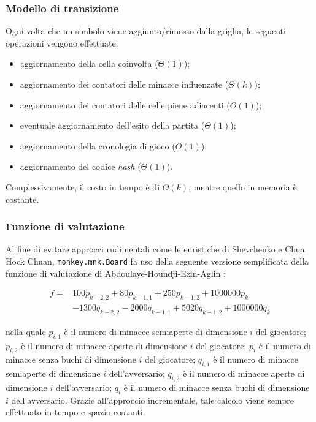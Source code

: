 \documentclass{article}
\begin{document}
\subsubsection{Modello di transizione}

Ogni volta che un simbolo viene aggiunto/rimosso dalla griglia, le seguenti
operazioni vengono effettuate:
\begin{itemize}
  \item aggiornamento della cella coinvolta ($\varTheta(1)$);
  \item aggiornamento dei contatori delle minacce influenzate ($\varTheta(k)$);
  \item aggiornamento dei contatori delle celle piene adiacenti
    ($\varTheta(1)$);
  \item eventuale aggiornamento dell'esito della partita ($\varTheta(1)$);
  \item aggiornamento della cronologia di gioco ($\varTheta(1)$);
  \item aggiornamento del codice \emph{hash} ($\varTheta(1)$).
\end{itemize}

Complessivamente, il costo in tempo è di $\varTheta(k)$, mentre quello in
memoria è costante.

\subsubsection{Funzione di valutazione}

Al fine di evitare approcci rudimentali come le euristiche di Shevchenko e Chua
Hock Chuan, \verb!monkey.mnk.Board! fa uso della seguente versione semplificata
della funzione di valutazione di Abdoulaye-Houndji-Ezin-Aglin \cite{abdoulaye}:

\begin{equation}
\begin{split}
  f ={} &100 p_{k - 2, 2} + 80 p_{k - 1, 1} + 250 p_{k - 1, 2} + 1000000 p_k \\
  & - 1300 q_{k - 2, 2} - 2000 q_{k - 1, 1} + 5020 q_{k - 1, 2} + 1000000 q_k
\end{split}
\end{equation}

nella quale $p_{i, 1}$ è il numero di minacce semiaperte di dimensione $i$ del
giocatore; $p_{i, 2}$ è il numero di minacce aperte di dimensione $i$ del
giocatore; $p_i$ è il numero di minacce senza buchi di dimensione $i$ del
giocatore; $q_{i, 1}$ è il numero di minacce semiaperte di dimensione $i$
dell'avversario; $q_{i, 2}$ è il numero di minacce aperte di dimensione $i$
dell'avversario; $q_i$ è il numero di minacce senza buchi di dimensione $i$
dell'avversario. Grazie all'approccio incrementale, tale calcolo viene sempre
effettuato in tempo e spazio costanti.
\end{document}
